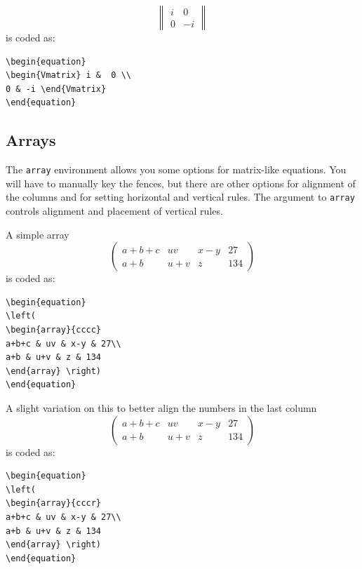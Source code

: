 \documentclass[journal]{IEEEtran}
\begin{document}
\begin{equation}
\begin{Vmatrix} i &  0 \\ 
0 & -i \end{Vmatrix}
\end{equation}
is coded as:
\begin{verbatim}
\begin{equation}
\begin{Vmatrix} i &  0 \\ 
0 & -i \end{Vmatrix}
\end{equation}\end{verbatim}

\subsection{Arrays}
The {\tt{array}} environment allows you some options for matrix-like equations. You will have to manually key the fences, but there are other options for alignment of the columns and for setting horizontal and vertical rules. The argument to {\tt{array}} controls alignment and placement of vertical rules.

A simple array
\begin{equation}
\left(
\begin{array}{cccc}
a+b+c & uv & x-y & 27\\
a+b & u+v & z & 134
\end{array}\right)
\end{equation}
is coded as:
\begin{verbatim}
\begin{equation}
\left(
\begin{array}{cccc}
a+b+c & uv & x-y & 27\\
a+b & u+v & z & 134
\end{array} \right)
\end{equation}
\end{verbatim}

A slight variation on this to better align the numbers in the last column
\begin{equation}
\left(
\begin{array}{cccr}
a+b+c & uv & x-y & 27\\
a+b & u+v & z & 134
\end{array}\right)
\end{equation}
is coded as:
\begin{verbatim}
\begin{equation}
\left(
\begin{array}{cccr}
a+b+c & uv & x-y & 27\\
a+b & u+v & z & 134
\end{array} \right)
\end{equation}
\end{verbatim}
\end{document}
